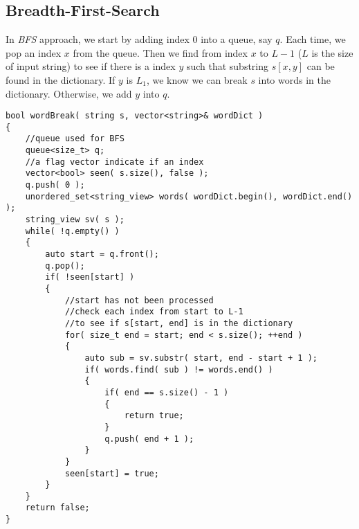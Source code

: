 \subsection{Breadth-First-Search}
In \textit{BFS} approach, we start by adding index 0 into a queue, say $q$. Each time, we pop an index $x$ from the queue. Then we find from index $x$ to $L-1$ ($L$ is the size of input string) to see if there is a index $y$ such that substring $s[x,y]$ can be found in the dictionary. If $y$ is $L_1$, we know we can break $s$ into words in the dictionary. Otherwise, we add $y$ into $q$.

\begin{lstlisting}[style=customc, caption={BFS}]
bool wordBreak( string s, vector<string>& wordDict )
{
    //queue used for BFS
    queue<size_t> q;
    //a flag vector indicate if an index
    vector<bool> seen( s.size(), false );
    q.push( 0 );
    unordered_set<string_view> words( wordDict.begin(), wordDict.end() );
    string_view sv( s );
    while( !q.empty() )
    {
        auto start = q.front();
        q.pop();
        if( !seen[start] )
        {
            //start has not been processed
            //check each index from start to L-1
            //to see if s[start, end] is in the dictionary
            for( size_t end = start; end < s.size(); ++end )
            {
                auto sub = sv.substr( start, end - start + 1 );
                if( words.find( sub ) != words.end() )
                {
                    if( end == s.size() - 1 )
                    {
                        return true;
                    }
                    q.push( end + 1 );
                }
            }
            seen[start] = true;
        }
    }
    return false;
}
\end{lstlisting}